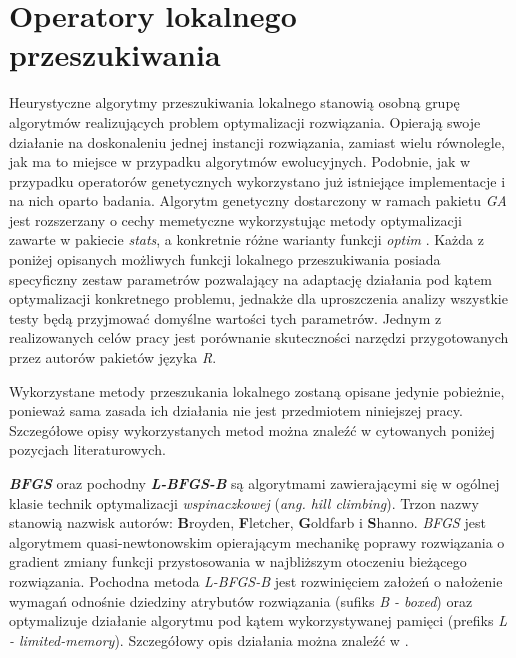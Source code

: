 \section{Operatory lokalnego przeszukiwania}
\label{sec:operatory_lokalnego_przeszukiwania}
\par
Heurystyczne algorytmy przeszukiwania lokalnego stanowią osobną grupę algorytmów realizujących problem optymalizacji rozwiązania. Opierają swoje działanie na doskonaleniu jednej instancji rozwiązania, zamiast wielu równolegle, jak ma to miejsce w przypadku algorytmów ewolucyjnych. Podobnie, jak w przypadku operatorów genetycznych wykorzystano już istniejące implementacje i na nich oparto badania. Algorytm genetyczny dostarczony w ramach pakietu \emph{GA} \cite{gaPackage} jest rozszerzany o cechy memetyczne wykorzystując metody optymalizacji zawarte w pakiecie \emph{stats}, a konkretnie różne warianty funkcji \emph{optim} \cite{statsPackage}. Każda z poniżej opisanych możliwych funkcji lokalnego przeszukiwania posiada specyficzny zestaw parametrów pozwalający na adaptację działania pod kątem optymalizacji konkretnego problemu, jednakże dla uproszczenia analizy wszystkie testy będą przyjmować domyślne wartości tych parametrów. Jednym z realizowanych celów pracy jest porównanie skuteczności narzędzi przygotowanych przez autorów pakietów języka \emph{R}.
\par
Wykorzystane metody przeszukania lokalnego zostaną opisane jedynie pobieżnie, ponieważ sama zasada ich działania nie jest przedmiotem niniejszej pracy. Szczegółowe opisy wykorzystanych metod można znaleźć w cytowanych poniżej pozycjach literaturowych.
\par
\textbf{\emph{BFGS}} oraz pochodny \textbf{\emph{L-BFGS-B}} są algorytmami zawierającymi się w ogólnej klasie technik optymalizacji \emph{wspinaczkowej} (\emph{ang. hill climbing}). Trzon nazwy stanowią nazwisk autorów:  \textbf{B}royden, \textbf{F}letcher, \textbf{G}oldfarb i \textbf{S}hanno. \emph{BFGS} jest algorytmem quasi-newtonowskim opierającym mechanikę poprawy rozwiązania o gradient zmiany funkcji przystosowania w najbliższym otoczeniu bieżącego rozwiązania. Pochodna metoda \emph{L-BFGS-B} jest rozwinięciem założeń o nałożenie wymagań odnośnie dziedziny atrybutów rozwiązania (sufiks \emph{B - boxed}) oraz optymalizuje działanie algorytmu pod kątem wykorzystywanej pamięci (prefiks \emph{L - limited-memory}). Szczegółowy opis działania można znaleźć w \cite{nocedal2006numerical}. 
